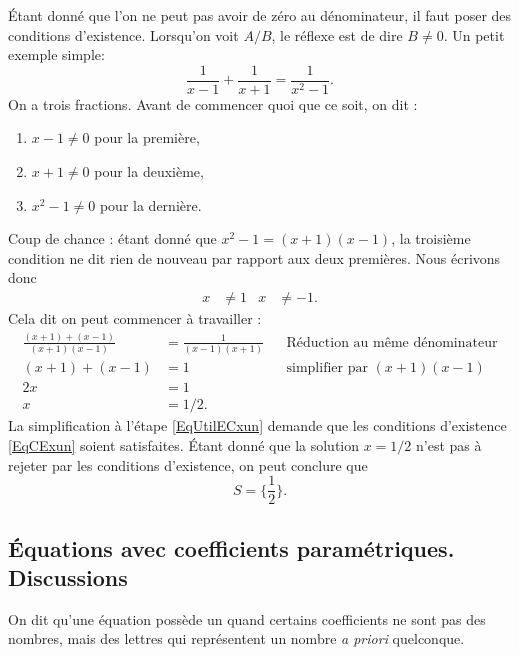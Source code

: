 Étant donné que l'on ne peut pas avoir de zéro au dénominateur, il faut poser des conditions d'existence. Lorsqu'on voit $A/B$, le réflexe est de dire $B\neq 0$. Un petit exemple \og simple\fg :
\begin{equation} 
  \frac{1}{ x-1 }+\frac{1}{ x+1 }=\frac{1}{ x^{2}-1 }.
\end{equation}
On a trois fractions. Avant de commencer quoi que ce soit, on dit :
\begin{enumerate}
\item $x-1\neq 0$ pour la première,
\item $x+1\neq 0$ pour la deuxième,
\item $x^{2}-1\neq 0$ pour la dernière.
\end{enumerate}
Coup de chance : étant donné que $x^{2}-1=(x+1)(x-1)$, la troisième condition ne dit rien de nouveau par rapport aux deux premières. Nous écrivons donc
\begin{align} \label{EqCExun}
    x&\neq 1& x&\neq-1.
\end{align}
Cela dit on peut commencer à travailler :
\begin{subequations}
\begin{align} 
 \frac{ (x+1)+(x-1) }{ (x+1)(x-1) }&=\frac{1}{ (x-1)(x+1) }&&\text{Réduction au même dénominateur}\\
(x+1)+(x-1)&=1&&\text{simplifier par $(x+1)(x-1)$ } \label{EqUtilECxun}\\
2x&=1\\
x&=1/2.
\end{align}
\end{subequations}
La simplification à l'étape \eqref{EqUtilECxun} demande que les conditions d'existence \eqref{EqCExun} soient satisfaites. Étant donné que la solution $x=1/2$ n'est pas à rejeter par les conditions d'existence, on peut conclure que
\begin{equation}
  S=\{ \frac{ 1 }{ 2 } \}.
\end{equation}

\subsection{Équations avec coefficients paramétriques. Discussions}

On dit qu'une équation possède un  quand certains coefficients ne sont pas des nombres, mais des lettres qui représentent un nombre \emph{a priori} quelconque.


